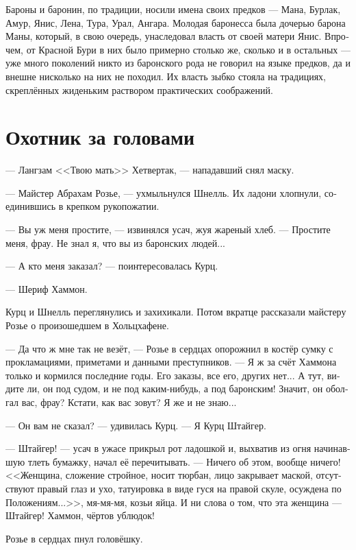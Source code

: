 \documentclass[a4paper,12pt,fleqn]{book}\usepackage{cooltooltips}\usepackage{polyglossia}\setdefaultlanguage[babelshorthands=true]{russian}\setotherlanguage{english}\defaultfontfeatures{Ligatures=TeX,Mapping=tex-text} \usepackage{xcolor}\definecolor{lightgray}{HTML}{bbbbbb}\color{lightgray}\newcommand{\ml}[3]{\textenglish{\textcolor{black}{#3}}}
\newcommand{\asterism}{\vspace{1em}{\centering\Large\bfseries$\ast~\ast~\ast$\par}\vspace{1em}}
\begin{document}
Бароны и баронин, по традиции, носили имена своих предков --- Мана, Бурлак, Амур, Янис, Лена, Тура, Урал, Ангара.
Молодая баронесса была дочерью барона Маны, который, в свою очередь, унаследовал власть от своей матери Янис.
Впрочем, от Красной Бури в них было примерно столько же, сколько и в остальных --- уже много поколений никто из баронского рода не говорил на языке предков, да и внешне нисколько на них не походил.
Их власть зыбко стояла на традициях, скреплённых жиденьким раствором практических соображений.

\section{Охотник за головами}

--- Лангзам <<Твою мать>> Хетвертак, --- нападавший снял маску.

--- Майстер Абрахам Розье, --- ухмыльнулся Шнелль.
Их ладони хлопнули, соединившись в крепком рукопожатии.

\asterism

--- Вы уж меня простите, --- извинялся усач, жуя жареный хлеб.
--- Простите меня, фрау.
Не знал я, что вы из баронских людей...

--- А кто меня заказал? --- поинтересовалась Курц.

--- Шериф Хаммон.

Курц и Шнелль переглянулись и захихикали.
Потом вкратце рассказали майстеру Розье о произошедшем в Хольцхафене.

--- Да что ж мне так не везёт, --- Розье в сердцах опорожнил в костёр сумку с прокламациями, приметами и данными преступников.
--- Я ж за счёт Хаммона только и кормился последние годы.
Его заказы, все его, других нет...
А тут, видите ли, он под судом, и не под каким-нибудь, а под баронским!
Значит, он оболгал вас, фрау?
Кстати, как вас зовут?
Я же и не знаю...

--- Он вам не сказал? --- удивилась Курц.
--- Я Курц Штайгер.

--- Штайгер! --- усач в ужасе прикрыл рот ладошкой и, выхватив из огня начинавшую тлеть бумажку, начал её перечитывать.
--- Ничего об этом, вообще ничего!
<<Женщина, сложение стройное, носит тюрбан, лицо закрывает маской, отсутствуют правый глаз и ухо, татуировка в виде гуся на правой скуле, осуждена по Положениям...>>, мя-мя-мя, козьи яйца.
И ни слова о том, что эта женщина --- Штайгер!
Хаммон, чёртов ублюдок!

Розье в сердцах пнул головёшку.
\end{document}
